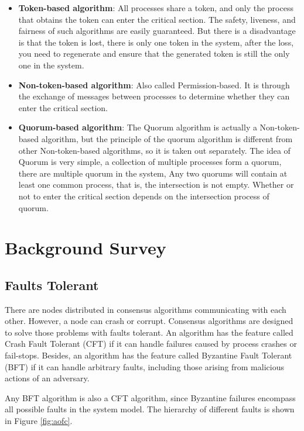 \documentclass[12pt, a4paper]{article}
\begin{document}
\begin{itemize}
  \item \textbf{Token-based algorithm}: All processes share a token, and only the
  process that obtains the token can enter the critical section. The safety,
  liveness, and fairness of such algorithms are easily guaranteed. But there is
  a disadvantage is that the token is lost, there is only one token in the
  system, after the loss, you need to regenerate and ensure that the generated
  token is still the only one in the system.
  \item \textbf{Non-token-based algorithm}: Also called Permission-based. It is
  through the exchange of messages between processes to determine whether they
  can enter the critical section.
  \item \textbf{Quorum-based algorithm}: The Quorum algorithm is actually a
  Non-token-based algorithm, but the principle of the quorum algorithm is
  different from other Non-token-based algorithms, so it is taken out
  separately. The idea of Quorum is very simple, a collection of multiple
  processes form a quorum, there are multiple quorum in the system, Any two
  quorums will contain at least one common process, that is, the intersection
  is not empty. Whether or not to enter the critical section depends on the
  intersection process of quorum.
\end{itemize}

\section{Background Survey}
\subsection{Faults Tolerant}
There are nodes distributed in consensus algorithms communicating with each other.
However, a node can crash or corrupt. Consensus algorithms are designed
to solve those problems with faults tolerant.
An algorithm has the feature called Crash Fault Tolerant (CFT)
if it can handle failures caused by process crashes or fail-stops.
Besides, an algorithm has the feature called Byzantine Fault Tolerant (BFT)
if it can handle arbitrary faults,
including those arising from malicious actions of an adversary.

Any BFT algorithm is also a CFT algorithm, since Byzantine failures encompass
all possible faults in the system model. The hierarchy of different faults
\cite{barborak1993consensus} is shown in Figure \ref{fig:aofc}.
\end{document}
